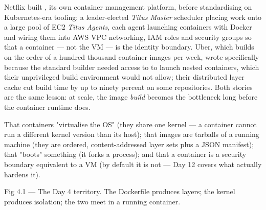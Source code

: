  Netflix built , its own container management platform, before standardising on Kubernetes-era tooling: a leader-elected \emph{Titus Master} scheduler placing work onto a large pool of EC2 \emph{Titus Agents}, each agent launching containers with Docker and wiring them into AWS VPC networking, IAM roles and security groups so that a container --- not the VM --- is the identity boundary. Uber, which builds on the order of a hundred thousand container images per week, wrote  specifically because the standard builder needed access to  to launch nested containers, which their unprivileged build environment would not allow; their distributed layer cache cut build time by up to ninety percent on some repositories. Both stories are the same lesson: at scale, the image \emph{build} becomes the bottleneck long before the container runtime does.

 That containers "virtualise the OS" (they share one kernel --- a container cannot run a different kernel version than its host); that images are tarballs of a running machine (they are ordered, content-addressed layer sets plus a JSON manifest); that  "boots" something (it forks a process); and that a container is a security boundary equivalent to a VM (by default it is not --- Day 12 covers what actually hardens it).


\begin{wbfigure}{Fig 4.1 — The Day 4 territory. The Dockerfile produces layers; the kernel produces isolation; the two meet in a running container.}
\end{wbfigure}


